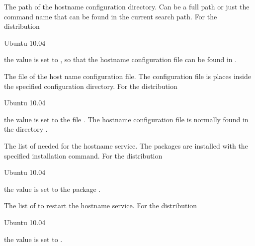 
The path of the hostname configuration directory. Can be a full path or
just the command name that can be found in the current search path.
For the distribution
\begin{inparaitem}
\item[\TheDistribution{ubuntu}] Ubuntu 10.04
\end{inparaitem}
the value is set to , so that the hostname configuration
file can be found in .


The file  of the host name configuration file. The configuration file
is places inside the specified configuration directory.
For the distribution
\begin{inparaitem}
\item[\TheDistribution{ubuntu}] Ubuntu 10.04
\end{inparaitem}
the value is set to the file . The hostname configuration
file is normally found in the directory .


The list of  needed for the hostname service. The packages
are installed with the specified installation command.
For the distribution
\begin{inparaitem}
\item[\TheDistribution{ubuntu}] Ubuntu 10.04
\end{inparaitem}
the value is set to the package .


The list of  to restart the hostname service.
For the distribution
\begin{inparaitem}
\item[\TheDistribution{ubuntu}] Ubuntu 10.04
\end{inparaitem}
the value is set to .


